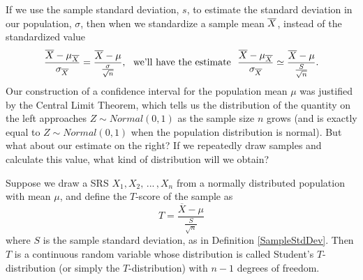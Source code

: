 \par
If we use the sample standard deviation, $s$, to estimate the standard deviation in our population, $\sigma$, then when we standardize a sample mean ${\overline{X}}$, instead of the standardized value
$$\frac{\overline{X} - \mu_{\overline{X}}}{\sigma_{\overline{X}}} = \frac{\overline{X} - \mu}{\frac{\sigma}{\sqrt{n}}}, \ \ \text{we'll have the estimate} \ \ \frac{\overline{X} - \mu_{\overline{X}}}{\sigma_{\overline{X}}} \simeq \frac{\overline{X} - \mu}{\frac{S}{\sqrt{n}}}.$$
Our construction of a confidence interval for the population mean $\mu$ was justified by the Central Limit Theorem, which tells us the distribution of the quantity on the left approaches $Z \sim Normal(0,1)$ as the sample size $n$ grows (and is exactly equal to $Z \sim Normal(0,1)$ when the population distribution is normal). But what about our estimate on the right? If we repeatedly draw samples and calculate this value, what kind of distribution will we obtain?
\par
\begin{defn}\label{TDistDef} Suppose we draw a SRS $X_1, X_2, \, ... \, , X_n$ from a normally distributed population with mean $\mu$, and define the $T$-score of the sample as
$$T = \frac{\overline{X} - \mu}{\frac{S}{\sqrt{n}}}$$
where $S$ is the sample standard deviation, as in Definition \ref{SampleStdDev}. Then $T$ is a continuous random variable whose distribution is called Student's $T$-distribution (or simply the $T$-distribution) with $n-1$ degrees of freedom.
\end{defn}
\begin{center}
\end{center}
